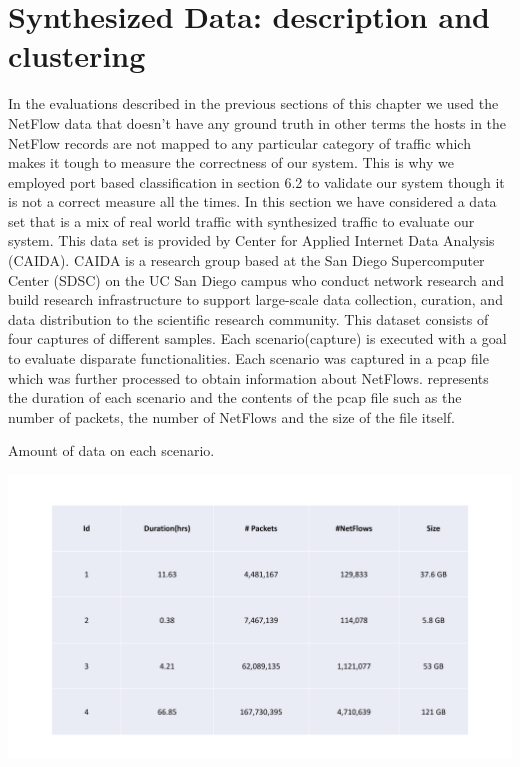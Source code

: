\section{Synthesized Data: description and clustering}

In the evaluations described in the previous sections of this chapter we used the NetFlow data that doesn't have any ground truth in other terms the hosts in the NetFlow records are not mapped to any particular category of traffic which makes it tough to measure the correctness of our system. This is why we employed port based classification in section 6.2 to validate our system though it is not a correct measure all the times. In this section we have considered a data set that is a mix of real world traffic with synthesized traffic to evaluate our system. This data set is provided by Center for Applied Internet Data Analysis (CAIDA). CAIDA is a research group based at the San Diego Supercomputer Center (SDSC) on the UC San Diego campus who conduct network research and build research infrastructure to support large-scale data collection, curation, and data distribution to the scientific research community. This dataset consists of four captures of different samples. Each scenario(capture) is executed with a goal to evaluate disparate functionalities. Each scenario was captured in a pcap file which was further processed to obtain information about NetFlows.  represents the duration of each scenario and the contents of the pcap file such as the number of packets, the number of NetFlows and the size of the file itself. 
\begin{table}[t]
	\caption{Amount of data on each scenario.}%
	\centerline{\includegraphics[scale = 0.5]{synth_desc.pdf}}	
\end{table}

